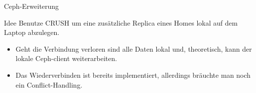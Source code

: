\documentclass[hyperref={xetex}]{beamer}
\begin{document}
\begin{frame}{Ceph-Erweiterung}
    \begin{block}{Idee}
Benutze CRUSH um eine zusätzliche Replica eines Homes lokal auf dem Laptop abzulegen.        
    \end{block}
    \begin{itemize}
        \item Geht die Verbindung verloren sind alle Daten lokal und, theoretisch, kann der lokale Ceph-client weiterarbeiten.
        \item Das Wiederverbinden ist bereits implementiert, allerdings bräuchte man noch ein Conflict-Handling.
    \end{itemize}





\end{frame}
\end{document}
